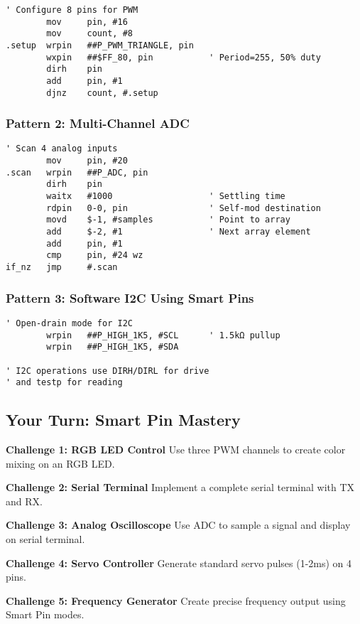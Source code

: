 \documentclass[11pt]{book}
\begin{document}
\begin{lstlisting}
' Configure 8 pins for PWM
        mov     pin, #16
        mov     count, #8
.setup  wrpin   ##P_PWM_TRIANGLE, pin
        wxpin   ##$FF_80, pin           ' Period=255, 50% duty
        dirh    pin
        add     pin, #1
        djnz    count, #.setup
\end{lstlisting}

\hypertarget{pattern-2-multi-channel-adc}{%
\subsubsection{Pattern 2: Multi-Channel
ADC}\label{pattern-2-multi-channel-adc}}

\begin{lstlisting}
' Scan 4 analog inputs
        mov     pin, #20
.scan   wrpin   ##P_ADC, pin
        dirh    pin
        waitx   #1000                   ' Settling time
        rdpin   0-0, pin                ' Self-mod destination
        movd    $-1, #samples           ' Point to array
        add     $-2, #1                 ' Next array element
        add     pin, #1
        cmp     pin, #24 wz
if_nz   jmp     #.scan
\end{lstlisting}

\hypertarget{pattern-3-software-i2c-using-smart-pins}{%
\subsubsection{Pattern 3: Software I2C Using Smart
Pins}\label{pattern-3-software-i2c-using-smart-pins}}

\begin{lstlisting}
' Open-drain mode for I2C
        wrpin   ##P_HIGH_1K5, #SCL      ' 1.5kΩ pullup
        wrpin   ##P_HIGH_1K5, #SDA
        
' I2C operations use DIRH/DIRL for drive
' and testp for reading
\end{lstlisting}

\hypertarget{your-turn-smart-pin-mastery}{%
\subsection{Your Turn: Smart Pin
Mastery}\label{your-turn-smart-pin-mastery}}

\begin{yourturn}
\textbf{Challenge 1: RGB LED Control}
Use three PWM channels to create color mixing on an RGB LED.

\textbf{Challenge 2: Serial Terminal}
Implement a complete serial terminal with TX and RX.

\textbf{Challenge 3: Analog Oscilloscope}
Use ADC to sample a signal and display on serial terminal.

\textbf{Challenge 4: Servo Controller}
Generate standard servo pulses (1-2ms) on 4 pins.

\textbf{Challenge 5: Frequency Generator}
Create precise frequency output using Smart Pin modes.
\end{yourturn}
\end{document}
